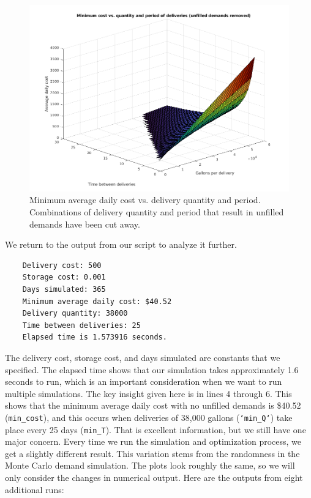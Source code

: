\documentclass{article}
\begin{document}
    \begin{figure}[p]
        \centering
        \includegraphics[width=\textwidth]{surface4.png}
        \caption{Minimum average daily cost vs. delivery quantity and period. Combinations of delivery quantity and period that result in unfilled demands have been cut away.}
        \label{fig:surface4}
    \end{figure}

    \clearpage

    We return to the output from our script to analyze it further.

    \begin{verbatim}
    Delivery cost: 500
    Storage cost: 0.001
    Days simulated: 365
    Minimum average daily cost: $40.52
    Delivery quantity: 38000
    Time between deliveries: 25
    Elapsed time is 1.573916 seconds.\end{verbatim}

    The delivery cost, storage cost, and days simulated are constants that we specified. The elapsed time shows that our simulation takes approximately 1.6 seconds to run, which is an important consideration when we want to run multiple simulations. The key insight given here is in lines 4 through 6. This shows that the minimum average daily cost with no unfilled demands is \$40.52 (\texttt{min\_cost}), and this occurs when deliveries of 38,000 gallons (\texttt{`min\_Q`}) take place every 25 days (\texttt{min\_T}). That is excellent information, but we still have one major concern. Every time we run the simulation and optimization process, we get a slightly different result. This variation stems from the randomness in the Monte Carlo demand simulation. The plots look roughly the same, so we will only consider the changes in numerical output. Here are the outputs from eight additional runs:
\end{document}
